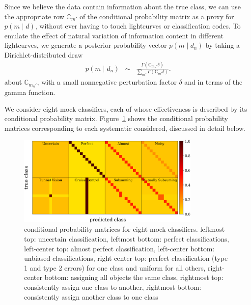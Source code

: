 Since we believe the data contain information about the true class, we can use the appropriate row $\mathbb{C}_{m'}$ of the conditional probability matrix as a proxy for $p(m \mid d)$, without ever having to touch lightcurves or classification codes.
To emulate the effect of natural variation of information content in different lightcurves, we generate a posterior probability vector $p(m \mid d_{n})$ by taking a Dirichlet-distributed draw
\begin{eqnarray}
  \label{eq:cmtoprob}
  p(m \mid d_{n}) &\sim& \frac{\Gamma(\mathbb{C}_{m_{n}'} \delta)}{\sum_{m'} \Gamma(\mathbb{C}_{m'} \delta)}.
\end{eqnarray}
about $\mathbb{C}_{m_{n}'}$, with a small nonnegative perturbation factor $\delta$ and in terms of the gamma function.

We consider eight mock classifiers, each of whose effectiveness is described by its conditional probability matrix.
Figure~\ref{fig:mock_cm} shows the conditional probability matrices corresponding to each systematic considered, discussed in detail below.
\begin{figure}
	\begin{center}
    \includegraphics[width=0.8\textwidth]{./fig/all_sim_cm.png}
		\caption{conditional probability matrices for eight mock classifiers.
    leftmost top: uncertain classification,
    leftmost bottom: perfect classifications,
    left-center top: almost perfect classification,
    left-center bottom: unbiased classifications,
    right-center top: perfect classification (type 1 and type 2 errors) for one class and uniform for all others,
    right-center bottom: assigning all objects the same class,
    rightmost top: consistently assign one class to another,
    rightmost bottom: consistently assign another class to one class}
		\label{fig:mock_cm}
	\end{center}
\end{figure}

